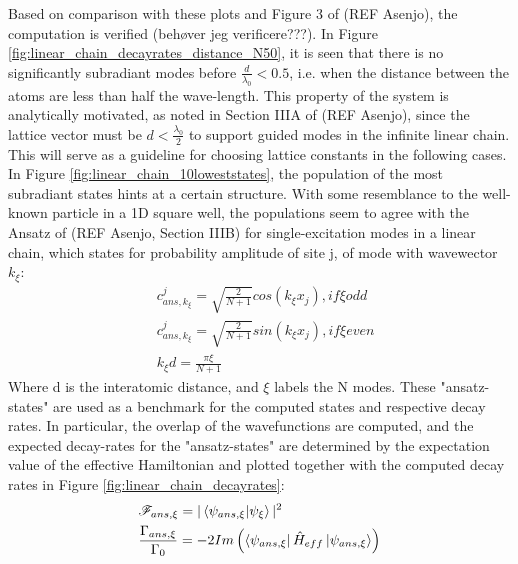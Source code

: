 \documentclass{article}
\begin{document}
Based on comparison with these plots and Figure 3 of (REF Asenjo), the computation is verified (behøver jeg verificere???). In Figure \ref{fig:linear_chain_decayrates_distance_N50}, it is seen that there is no significantly subradiant modes before $\frac{d}{\lambda_0} < 0.5$, i.e. when the distance between the atoms are less than half the wave-length. This property of the system is analytically motivated, as noted in Section IIIA of (REF Asenjo), since the lattice vector must be $d < \frac{\lambda_0}{2}$ to support guided modes in the infinite linear chain. This will serve as a guideline for choosing lattice constants in the following cases. In Figure \ref{fig:linear_chain_10loweststates}, the population of the most subradiant states hints at a certain structure. With some resemblance to the well-known particle in a 1D square well, the populations seem to agree with the Ansatz of (REF Asenjo, Section IIIB) for single-excitation modes in a linear chain, which states for probability amplitude of site j, of mode with wavewector $k_\xi$: 
\begin{equation}\label{eq:ansatz}
    \begin{split}
        & c^j_{ans,k_\xi} = \sqrt{\frac{2}{N + 1}} cos(k_\xi x_j), if \xi odd \\
        & c^j_{ans,k_\xi} = \sqrt{\frac{2}{N + 1}} sin(k_\xi x_j), if \xi even \\
        & k_\xi d = \frac{\pi \xi}{N + 1}
    \end{split}
\end{equation}
Where d is the interatomic distance, and $\xi$ labels the N modes. These "ansatz-states" are used as a benchmark for the computed states and respective decay rates. In particular, the overlap of the wavefunctions are computed, and the expected decay-rates for the "ansatz-states" are determined by the expectation value of the effective Hamiltonian and plotted together with the computed decay rates in Figure \ref{fig:linear_chain_decayrates}:
\begin{equation}\label{eq:overlap}
    \begin{split}
        &\mathscr{F}_{ans,\xi} = |\bra{\psi_{ans,\xi}}\ket{\psi_\xi}|^2 \\
        &\frac{\Gamma_{ans,\xi}}{\Gamma_0} = -2 Im \left( \bra{\psi_{ans,\xi}} \hat{H}_{eff} \ket{\psi_{ans,\xi}} \right)
    \end{split}
\end{equation}
\end{document}
